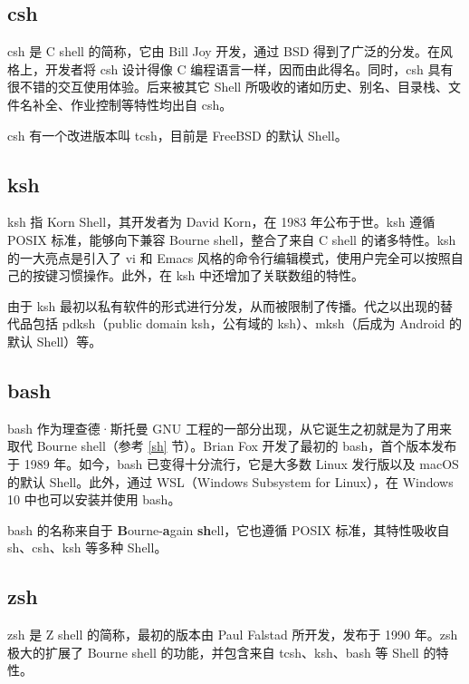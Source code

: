 \documentclass[]{ctexbook}
\begin{document}
\hypertarget{csh}{%
\subsection{csh}\label{csh}}

csh 是 C shell 的简称，它由 Bill Joy 开发，通过 BSD 得到了广泛的分发。在风格上，开发者将 csh 设计得像 C 编程语言一样，因而由此得名。同时，csh 具有很不错的交互使用体验。后来被其它 Shell 所吸收的诸如历史、别名、目录栈、文件名补全、作业控制等特性均出自 csh。

csh 有一个改进版本叫 tcsh，目前是 FreeBSD 的默认 Shell。

\hypertarget{ksh}{%
\subsection{ksh}\label{ksh}}

ksh 指 Korn Shell，其开发者为 David Korn，在 1983 年公布于世。ksh 遵循 POSIX 标准，能够向下兼容 Bourne shell，整合了来自 C shell 的诸多特性。ksh 的一大亮点是引入了 vi 和 Emacs 风格的命令行编辑模式，使用户完全可以按照自己的按键习惯操作。此外，在 ksh 中还增加了关联数组的特性。

由于 ksh 最初以私有软件的形式进行分发，从而被限制了传播。代之以出现的替代品包括 pdksh（public domain ksh，公有域的 ksh）、mksh（后成为 Android 的默认 Shell）等。

\hypertarget{bash}{%
\subsection{bash}\label{bash}}

bash 作为理查德·斯托曼 GNU 工程的一部分出现，从它诞生之初就是为了用来取代 Bourne shell（参考 \ref{sh} 节）。Brian Fox 开发了最初的 bash，首个版本发布于 1989 年。如今，bash 已变得十分流行，它是大多数 Linux 发行版以及 macOS 的默认 Shell。此外，通过 WSL（Windows Subsystem for Linux），在 Windows 10 中也可以安装并使用 bash。

bash 的名称来自于 \textbf{B}ourne-\textbf{a}gain \textbf{sh}ell，它也遵循 POSIX 标准，其特性吸收自 sh、csh、ksh 等多种 Shell。

\hypertarget{zsh}{%
\subsection{zsh}\label{zsh}}

zsh 是 Z shell 的简称，最初的版本由 Paul Falstad 所开发，发布于 1990 年。zsh 极大的扩展了 Bourne shell 的功能，并包含来自 tcsh、ksh、bash 等 Shell 的特性。
\end{document}
